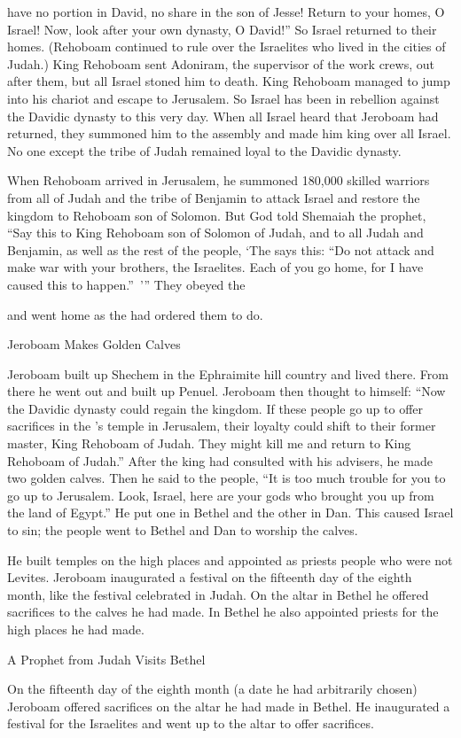{have no portion
in David,
no
share
in the son
of Jesse! Return
to your homes,
O Israel! Now,
look
after your own dynasty,
O David!” So
Israel
returned to their homes.
(Rehoboam
continued to rule
over
the Israelites
who lived
in the cities
of Judah.)
King
Rehoboam
sent
Adoniram,
the supervisor
of the work crews,
out after them, but all
Israel
stoned
him to death.
King
Rehoboam
managed
to jump into
his chariot
and escape
to Jerusalem.
So Israel
has been in rebellion against
the Davidic
dynasty
to this
very day.
When
all
Israel
heard
that
Jeroboam
had returned,
they summoned
him to
the assembly
and made him king
over
all
Israel.
No
one except
the tribe
of Judah
remained
loyal to the Davidic
dynasty.
\par }{\PP {}When Rehoboam
arrived
in Jerusalem,
he summoned
180,000
skilled
warriors
from all
of Judah
and the tribe
of Benjamin
to attack
Israel
and restore
the kingdom
to Rehoboam
son
of Solomon.
But God
told
Shemaiah
the prophet,
“Say
this to
King
Rehoboam
son
of Solomon
of Judah,
and to
all
Judah
and Benjamin,
as well as the rest
of the people,
‘The
{}
says
this: “Do not
attack
and make war
with
your brothers,
the Israelites.
Each
of you go
home,
for
I have caused
this
to happen.” ’” They obeyed
the

{}
and went
home
as
the
{}
had ordered them to do.
\par }{\SH Jeroboam Makes Golden Calves
\par }{\PP {}Jeroboam
built
up Shechem
in the Ephraimite
hill country
and lived
there. From there
he went out
and built
up Penuel.
Jeroboam
then thought to himself: “Now
the Davidic
dynasty
could regain
the kingdom.
If
these
people
go up
to offer
sacrifices
in the
{}’s
temple
in Jerusalem,
their loyalty could shift
to
their former master,
King
Rehoboam
of Judah.
They might kill
me and return
to
King
Rehoboam
of Judah.”
After the king
had consulted
with his advisers, he made
two
golden
calves.
Then he said
to
the people, “It is too much
trouble for you to go up
to Jerusalem.
Look,
Israel,
here are your gods
who
brought you up
from the land
of Egypt.”
He put
one
in Bethel
and the
other
in Dan.
This
caused
Israel to sin;
the people
went
to Bethel and Dan to worship the calves.
\par }{\PP {}He built
temples
on the high places
and appointed
as priests
people
who
were not
Levites.
Jeroboam
inaugurated
a festival
on the fifteenth
day
of the eighth
month,
like the festival
celebrated in Judah.
On
the altar
in Bethel
he offered sacrifices
to the calves
he had
made.
In Bethel
he also
appointed
priests
for the high places
he had
made.
\par }{\SH A Prophet from Judah Visits Bethel
\par }{\PP {}On the fifteenth
day
of the eighth
month
(a date he had
arbitrarily chosen) Jeroboam offered sacrifices
on
the altar
he had made
in Bethel.
He inaugurated
a festival
for the Israelites
and went up
to the altar
to offer sacrifices.

}
